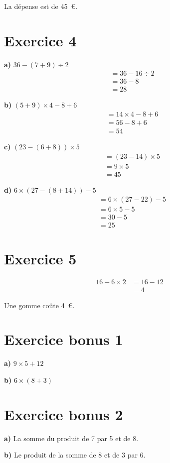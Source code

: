 \documentclass[12pt]{extarticle}
\begin{document}
La dépense est de 45~€.

\section*{Exercice 4}

\textbf{a)} $36 - (7 + 9) \div 2$
\begin{align*}
&= 36 - 16 \div 2 \\
&= 36 - 8 \\
&= 28
\end{align*}

\textbf{b)} $(5 + 9) \times 4 - 8 + 6$
\begin{align*}
&= 14 \times 4 - 8 + 6 \\
&= 56 - 8 + 6 \\
&= 54
\end{align*}

\textbf{c)} $(23 - (6 + 8)) \times 5$
\begin{align*}
&= (23 - 14) \times 5 \\
&= 9 \times 5 \\
&= 45
\end{align*}

\textbf{d)} $6 \times (27 - (8 + 14)) - 5$
\begin{align*}
&= 6 \times (27 - 22) - 5 \\
&= 6 \times 5 - 5 \\
&= 30 - 5 \\
&= 25
\end{align*}

\section*{Exercice 5}
\begin{align*}
16 - 6 \times 2 &= 16 - 12 \\
                &= 4
\end{align*}

Une gomme coûte 4~€.

\section*{Exercice bonus 1}

\textbf{a)} $9 \times 5 + 12$

\textbf{b)} $6 \times (8 + 3)$

\section*{Exercice bonus 2}

\textbf{a)} La somme du produit de 7 par 5 et de 8.

\textbf{b)} Le produit de la somme de 8 et de 3 par 6.
\end{document}
